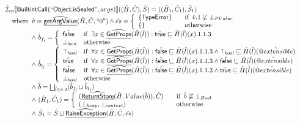 \[
\begin{array}{l}


\aI _{cp}\lbr \SF{BuiltintCall}(``\SF{Object.isSealed}",args)\rbr((\hat{H},\hat{C}), \hat{S})
  = ((\hat{H}_1, \hat{C}_1), \hat{S}_1)\\
\quad\wherec{
 \hat{v} = \ahf{getArgValue}(\hat{H}, \hat{C}, ``0")
  \land \hat{es} =
    \left\{
    \begin{array}{l@{\quad\quad}l}
      \{ \SF{TypeError} \} & \ifc{\hat{v}.1 \not\sqsubseteq \bot_{PValue}}\\
      \{ \}& \owc\\
    \end{array}
    \right.\\
  \land\ \hat{b}_{f_{\hat{l}}} =\left\{\begin{array}{ll}
    \afalse
    & \ifc{ \exists x \in \ahf{GetProps}(\hat{H}(\hat{l})): \atrue \sqsubseteq \hat{H}(\hat{l})(x).1.1.3}\\
    \bot_{bool} & \owc
    \end{array}\right.\\
  \land\ \hat{b}_{t_{\hat{l}}} =\left\{\begin{array}{ll}
    \top_{bool}
    & \ifc{\forall x \in \ahf{GetProps}(\hat{H}(\hat{l})):
      \afalse \sqsubseteq \hat{H}(\hat{l})(x).1.1.3 \land \top_{bool} \sqsubseteq \hat{H}(\hat{l})(\avarprop{extensible})}\\
    \atrue
    & \ifc{\forall x \in \ahf{GetProps}(\hat{H}(\hat{l})):
      \afalse \sqsubseteq \hat{H}(\hat{l})(x).1.1.3 \land \afalse \sqsubseteq \hat{H}(\hat{l})(\avarprop{extensible})}\\
    \afalse
    & \ifc{\forall x \in \ahf{GetProps}(\hat{H}(\hat{l})):
    \afalse \sqsubseteq \hat{H}(\hat{l})(x).1.1.3 \land \atrue \sqsubseteq \hat{H}(\hat{l})(\avarprop{extensible})}\\
    \bot_{bool} & \owc
    \end{array}\right.\\
  \land\ \hat{b} =  \bigsqcup_{\hat{l} \in \hat{v}.2}(\hat{b}_{f_{\hat{l}}} \sqcup \hat{b}_{t_{\hat{l}}})\\
  \land\ (\hat{H}_1, \hat{C}_1) = 
    \left\{\begin{array}{l@{\quad\quad}l}
      (\ahf{ReturnStore}(\hat{H}, Value(\hat{b})), \hat{C})
      & \ifc{\hat{b} \not\sqsubseteq \bot_{Bool}}\\
      (\bot_{heap}, \bot_{context}) & \owc \\
    \end{array}\right.\\
  \land\ \hat{S}_1 = \hat{S} \sqcup \ahf{RaiseException}(\hat{H}, \hat{C}, \hat{es})\\
  }\\
\\\\ 


\end{array}\]
